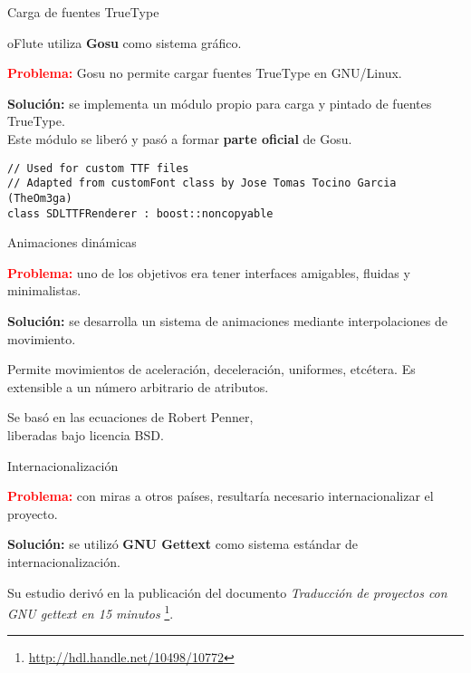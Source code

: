 \begin{frame}[fragile]{Carga de fuentes TrueType}
  \begin{center}
    oFlute utiliza \textbf{Gosu} como sistema gráfico.
    
    \pause
    \medskip
    
    \textcolor{red}{\textbf{Problema:}} Gosu no permite cargar fuentes TrueType
    en GNU/Linux.

    \pause
    \medskip
    
    \textcolor{dgreen}{\textbf{Solución:}} se implementa un módulo propio para
    carga y pintado de fuentes TrueType. \pause\\[1em]Este módulo se liberó y pasó a
    formar \textbf{parte oficial} de Gosu.
  \end{center}
  \begin{verbatim}
// Used for custom TTF files
// Adapted from customFont class by Jose Tomas Tocino Garcia (TheOm3ga)
class SDLTTFRenderer : boost::noncopyable
  \end{verbatim}
\end{frame}

\begin{frame}{Animaciones dinámicas}
  \begin{center}
    \textcolor{red}{\textbf{Problema:}} uno de los objetivos era tener
    interfaces amigables, fluidas y minimalistas.

    \pause \medskip

    \textcolor{dgreen}{\textbf{Solución:}} se desarrolla un sistema de
    animaciones mediante interpolaciones de movimiento.

    \pause\medskip

    Permite movimientos de aceleración, deceleración, uniformes, etcétera. Es
    extensible a un número arbitrario de atributos.

    \pause\medskip

    Se basó en las ecuaciones de Robert Penner, \\liberadas bajo licencia BSD.
    
  \end{center}  
\end{frame}

\begin{frame}{Internacionalización}
  \begin{center}
    \textcolor{red}{\textbf{Problema:}} con miras a otros países, resultaría
    necesario internacionalizar el proyecto.

    \pause \medskip

    \textcolor{dgreen}{\textbf{Solución:}} se utilizó \textbf{GNU Gettext} como
    sistema estándar de internacionalización. 
    
    \pause\medskip

    Su estudio derivó en la publicación del documento \textit{Traducción de
      proyectos con GNU gettext en 15 minutos}
    \footnote{\url{http://hdl.handle.net/10498/10772}}.

  \end{center}
\end{frame}
